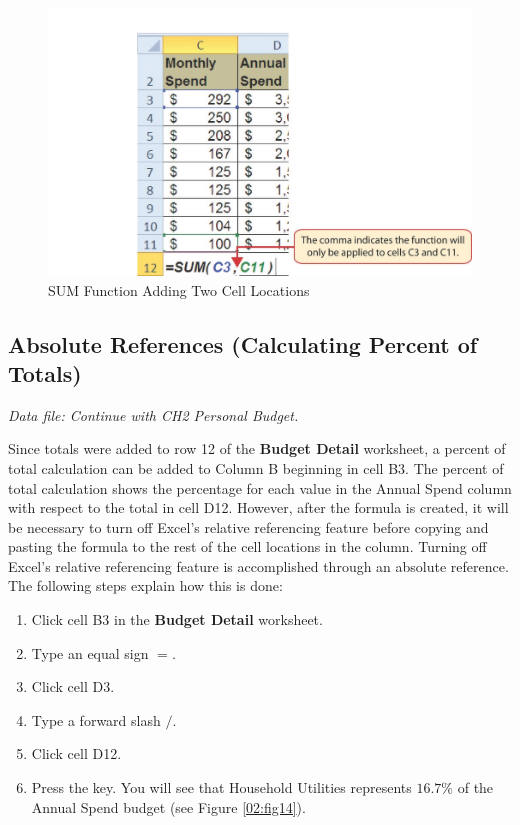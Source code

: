 \begin{figure}[H]
	\centering
	\includegraphics[width=\maxwidth{.95\linewidth}]{gfx/ch02_fig13}
	\caption{SUM Function Adding Two Cell Locations}
	\label{02:fig13}
\end{figure}

\subsection{Absolute References (Calculating Percent of Totals)}

\textit{Data file: Continue with CH2 Personal Budget.}

Since totals were added to row 12 of the \textbf{Budget Detail} worksheet, a percent of total calculation can be added to Column B beginning in cell \textsf{B3}. The percent of total calculation shows the percentage for each value in the Annual Spend column with respect to the total in cell \textsf{D12}. However, after the formula is created, it will be necessary to turn off Excel's relative referencing feature before copying and pasting the formula to the rest of the cell locations in the column. Turning off Excel's relative referencing feature is accomplished through an absolute reference. The following steps explain how this is done:

\begin{enumerate}
	\item Click cell \textsf{B3} in the \textbf{Budget Detail} worksheet.
	\item Type an equal sign $ = $.
	\item Click cell \textsf{D3}.
	\item Type a forward slash $ / $.
	\item Click cell \textsf{D12}.
	\item Press the  key. You will see that Household Utilities represents $ 16.7\% $ of the Annual Spend budget (see Figure \ref{02:fig14}).
\end{enumerate}

